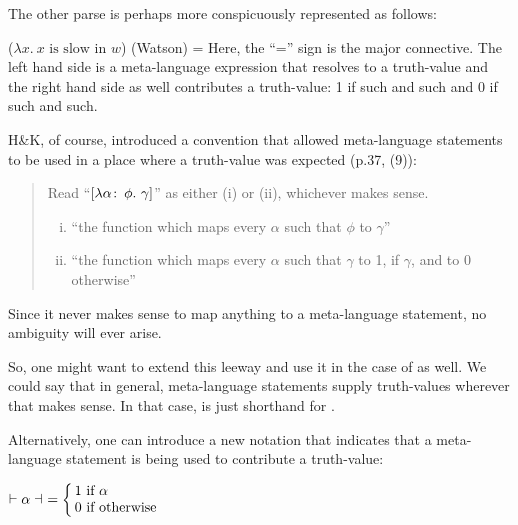 %
The other parse is perhaps more conspicuously represented as follows:

\ex ($\lambda x.\ x \mbox{ is slow in } w$) (Watson) =  \xe
%
Here, the ``='' sign is the major connective. The left hand side is a
meta-language expression that resolves to a truth-value and the right hand side
as well contributes a truth-value: 1 if such and such and 0 if such and such.

H\&K, of course, introduced a convention that allowed meta-language
statements to be used in a place where a truth-value was expected (p.37, (9)):

\begin{quote}
  Read ``$[\lambda \alpha\co \phi.\ \gamma]$'' as either (i) or (ii),
  whichever makes sense.
  \begin{enumerate}[(i)]
  \item ``the function which maps every $\alpha$ such that $\phi$ to
    $\gamma$''
  \item ``the function which maps every $\alpha$ such that $\gamma$ to
    1, if $\gamma$, and to 0 otherwise''
  \end{enumerate}
\end{quote}
%
Since it never makes sense to map anything to a meta-language statement, no
ambiguity will ever arise.

%
So, one might want to extend this leeway and use it in the case of
 as well. We could say that in general, meta-language
statements supply truth-values wherever that makes sense. In that case,
 is just shorthand for .

\newcommand{\nupsis}[1]{\ensuremath{\vdash #1 \dashv}}

Alternatively, %
%
one can introduce a new notation that indicates that a meta-language statement
is being used to contribute a truth-value:

\ex $\nupsis{\alpha}\ = \leftchoice{1 if $\alpha$,0 if otherwise}$ \xe

